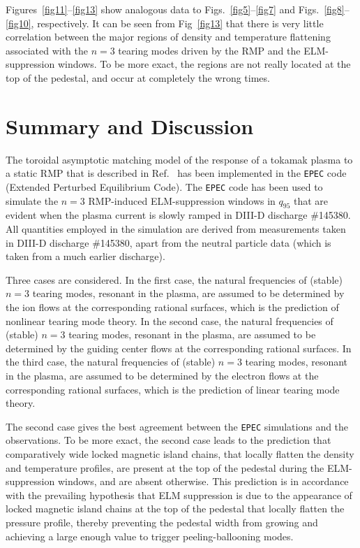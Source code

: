 \documentclass[12pt,prb,aps]{revtex4-1}
\begin{document}
Figures~\ref{fig11}--\ref{fig13} show analogous data to Figs.~\ref{fig5}--\ref{fig7} and Figs.~\ref{fig8}--\ref{fig10}, respectively.  
It can be seen from Fig~\ref{fig13} that there is very little correlation between the major regions of density and temperature flattening associated
with the $n=3$ tearing modes driven by the RMP and the  ELM-suppression windows. To be more exact, the 
regions  are not really located at the top of the pedestal, and occur at completely the wrong times.  

\section{Summary and Discussion}
The toroidal asymptotic matching model of the response of a tokamak plasma to a static RMP that is described in Ref.~
has been implemented in the {\tt EPEC} code (Extended Perturbed Equilibrium Code). The {\tt EPEC} code has  been used to simulate the $n=3$ RMP-induced ELM-suppression
windows in $q_{95}$ that are evident when the plasma current is slowly ramped in DIII-D discharge \#145380. All quantities employed in the simulation are
derived from measurements taken in DIII-D discharge \#145380, apart from the neutral particle data (which is taken from a much earlier discharge).

Three cases are considered. In the first case, the natural frequencies of (stable) $n=3$ tearing modes, resonant in the plasma, are assumed to be
determined by the ion flows at the corresponding rational surfaces, which is the prediction of nonlinear tearing mode theory.\cite{nl1,nl2,nl3}
In the second case, the natural frequencies of (stable) $n=3$ tearing modes, resonant in the plasma, are assumed to be
determined by the guiding center flows at the corresponding rational surfaces.\cite{heyn,paz1} 
In the third case, the natural frequencies of (stable) $n=3$ tearing modes, resonant in the plasma, are assumed to be
determined by the electron flows at the corresponding rational surfaces, which is the prediction of linear tearing mode theory.\cite{lin1,lin2,lin3}

The second case gives the best agreement between the {\tt EPEC} simulations and the  observations. To be more
exact, the second case leads to the prediction that comparatively wide locked magnetic island chains, that locally flatten the density and temperature profiles, 
 are present at the top of the pedestal during the ELM-suppression
windows, and are absent otherwise. This prediction is in accordance with the prevailing hypothesis that ELM suppression is due to the appearance of locked
magnetic island chains at the top of the pedestal that locally flatten the pressure profile, thereby preventing the pedestal width from growing and achieving a  
large enough value to trigger peeling-ballooning modes.\cite{d3d}
\end{document}
